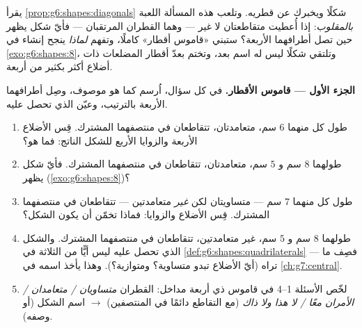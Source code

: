 \begin{problem}
\label{pb:g6:shapes:1}
يقرأ \cref{prop:g6:shapes:diagonals} شكلًا ويخبرك عن
قطريه. وتلعب هذه المسألة اللعبة \emph{بالمقلوب}: إذا أُعطيت
 متقاطعتان لا غير --- وهما القطران المرتقبان --- فأيّ شكل
يظهر حين تصل أطرافهما الأربعة؟ ستبني «قاموس
أقطار» كاملًا، وتفهم \emph{لماذا} ينجح إنشاء 
في \cref{exo:g6:shapes:8}، وتلتقي شكلًا ليس له اسم
بعد، وتختم بعدّ أقطار المضلعات
ذات أضلاع أكثر بكثير من أربعة.

\medskip
\noindent\textbf{الجزء الأول --- قاموس الأقطار.}
في كل سؤال، اُرسم  كما هو موصوف، وصِل أطرافهما
الأربعة بالترتيب، وعيّن  الذي تحصل عليه.
\begin{enumerate}
  \item {} طول كل منهما $6$ سم، متعامدتان، تتقاطعان في
        منتصفهما المشترك. قِس الأضلاع الأربعة والزوايا
        الأربع للشكل الناتج: فما هو؟
  \item {} طولهما $8$ سم و $5$ سم، متعامدتان،
        تتقاطعان في منتصفهما المشترك. فأيّ شكل يظهر
        (\cref{exo:g6:shapes:8})؟
  \item {} طول كل منهما $7$ سم --- متساويتان لكن \emph{غير}
        متعامدتين --- تتقاطعان في منتصفهما المشترك.
        قِس الأضلاع والزوايا: فماذا تخمّن أن يكون
        الشكل؟
  \item {} طولهما $8$ سم و $5$ سم، غير متعامدتين،
        تتقاطعان في منتصفهما المشترك. والشكل الذي تحصل عليه
        ليس أيًّا من الثلاثة في
        \cref{def:g6:shapes:quadrilaterals} --- فصِف ما
        تراه (أيّ الأضلاع تبدو متساوية؟ ومتوازية؟). وهذا
         يأخذ اسمه في \cref{ch:g7:central}.
  \item لخّص الأسئلة 1--4 في قاموس ذي أربعة
        مداخل: القطران \emph{متساويان / متعامدان / الأمران معًا /
        لا هذا ولا ذاك} (مع التقاطع دائمًا في المنتصفين)
        $\rightarrow$ اسم الشكل (أو وصفه).
\end{enumerate}


\end{problem}
